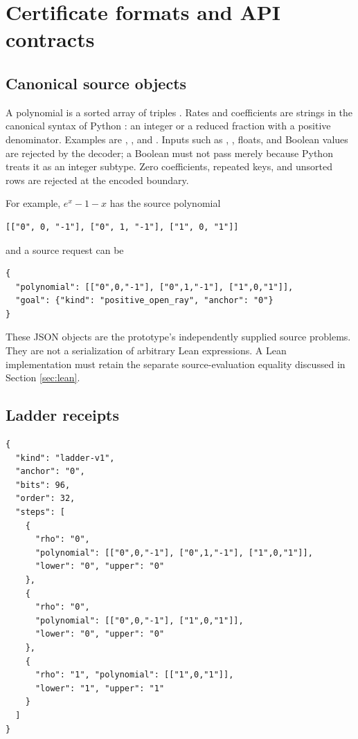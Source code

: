 \section{Certificate formats and API contracts}
\label{app:formats}

\subsection{Canonical source objects}

A polynomial is a sorted array of triples
. Rates and coefficients are strings in the
canonical syntax of Python : an integer or a reduced fraction
with a positive denominator. Examples are , , and
. Inputs such as , , floats, and Boolean
values are rejected by the decoder; a Boolean must not pass merely because
Python treats it as an integer subtype. Zero coefficients, repeated keys, and
unsorted rows are rejected at the encoded boundary.

For example, $e^x-1-x$ has the source polynomial
\par\noindent\begin{minipage}{\linewidth}
\begin{lstlisting}
[["0", 0, "-1"], ["0", 1, "-1"], ["1", 0, "1"]]
\end{lstlisting}
\end{minipage}\par
and a source request can be
\par\noindent\begin{minipage}{\linewidth}
\begin{lstlisting}
{
  "polynomial": [["0",0,"-1"], ["0",1,"-1"], ["1",0,"1"]],
  "goal": {"kind": "positive_open_ray", "anchor": "0"}
}
\end{lstlisting}
\end{minipage}\par

These JSON objects are the prototype's independently supplied source problems.
They are not a serialization of arbitrary Lean expressions. A Lean implementation
must retain the separate source-evaluation equality discussed in Section
\ref{sec:lean}.

\subsection{Ladder receipts}

\par\noindent\begin{minipage}{\linewidth}
\begin{lstlisting}
{
  "kind": "ladder-v1",
  "anchor": "0",
  "bits": 96,
  "order": 32,
  "steps": [
    {
      "rho": "0",
      "polynomial": [["0",0,"-1"], ["0",1,"-1"], ["1",0,"1"]],
      "lower": "0", "upper": "0"
    },
    {
      "rho": "0",
      "polynomial": [["0",0,"-1"], ["1",0,"1"]],
      "lower": "0", "upper": "0"
    },
    {
      "rho": "1", "polynomial": [["1",0,"1"]],
      "lower": "1", "upper": "1"
    }
  ]
}
\end{lstlisting}
\end{minipage}\par

